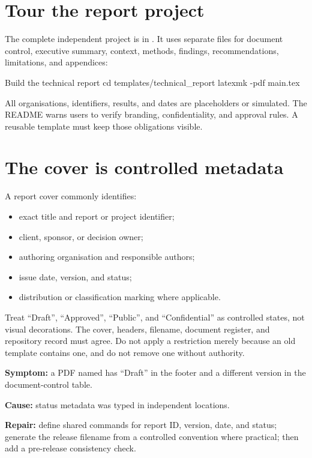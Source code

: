 \section{Tour the report project}

The complete independent project is in
. It uses separate files for document
control, executive summary, context, methods, findings, recommendations,
limitations, and appendices:

\begin{terminalcode}{Build the technical report}
cd templates/technical_report
latexmk -pdf main.tex
\end{terminalcode}

All organisations, identifiers, results, and dates are placeholders or
simulated. The README warns users to verify branding, confidentiality, and
approval rules. A reusable template must keep those obligations visible.

\section{The cover is controlled metadata}

A report cover commonly identifies:

\begin{itemize}
  \item exact title and report or project identifier;
  \item client, sponsor, or decision owner;
  \item authoring organisation and responsible authors;
  \item issue date, version, and status;
  \item distribution or classification marking where applicable.
\end{itemize}

Treat ``Draft'', ``Approved'', ``Public'', and ``Confidential'' as controlled
states, not visual decorations. The cover, headers, filename, document register,
and repository record must agree. Do not apply a restriction merely because an
old template contains one, and do not remove one without authority.

\begin{commonerror}
\textbf{Symptom:} a PDF named  has ``Draft'' in the footer and a
different version in the document-control table.

\textbf{Cause:} status metadata was typed in independent locations.

\textbf{Repair:} define shared commands for report ID, version, date, and status;
generate the release filename from a controlled convention where practical;
then add a pre-release consistency check.
\end{commonerror}


